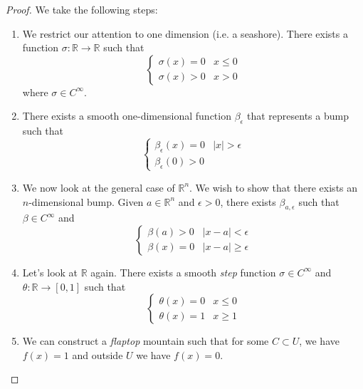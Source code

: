 \documentclass{article}
\numberwithin{equation}{section}
\begin{document}
\begin{proof}
    We take the following steps:
    \begin{enumerate}
        \item We restrict our attention to one dimension (i.e. a seashore). There exists a function $\sigma: \mathbb{R} \rightarrow \mathbb{R}$ such that 
        \begin{equation}
            \begin{cases}
                \sigma(x) = 0 & x \le 0 \\ 
                \sigma(x) > 0 & x > 0
            \end{cases}
        \end{equation}
        where $\sigma \in C^\infty$.
        \item There exists a smooth one-dimensional function $\beta_\epsilon$ that represents a bump such that
        \begin{equation}
            \begin{cases}
                \beta_\epsilon(x) = 0 & |x| > \epsilon \\ 
                \beta_\epsilon(0) > 0
            \end{cases}
        \end{equation} 
        \item We now look at the general case of $\mathbb{R}^n$. We wish to show that there exists an $n$-dimensional bump. Given $a \in \mathbb{R}^n$ and $\epsilon > 0$, there exists $\beta_{a,\epsilon}$ such that $\beta \in C^\infty$ and 
        \begin{equation}
            \begin{cases}
                \beta(a) > 0 & |x-a| < \epsilon \\
                \beta(x) = 0 & |x-a| \ge \epsilon
            \end{cases}
        \end{equation}
        \item Let's look at $\mathbb{R}$ again. There exists a smooth \textit{step} function $\sigma\in C^\infty$ and $\theta:\mathbb{R} \rightarrow [0,1]$ such that 
        \begin{equation}
            \begin{cases}
                \theta(x) = 0 & x \le 0 \\ 
                \theta(x) = 1 & x \ge 1
            \end{cases}
        \end{equation}
        \item We can construct a \textit{flaptop} mountain such that for some $C \subset U$, we have $f(x)=1$ and outside $U$ we have $f(x)=0.$

\end{enumerate}
\end{proof}
\end{document}

